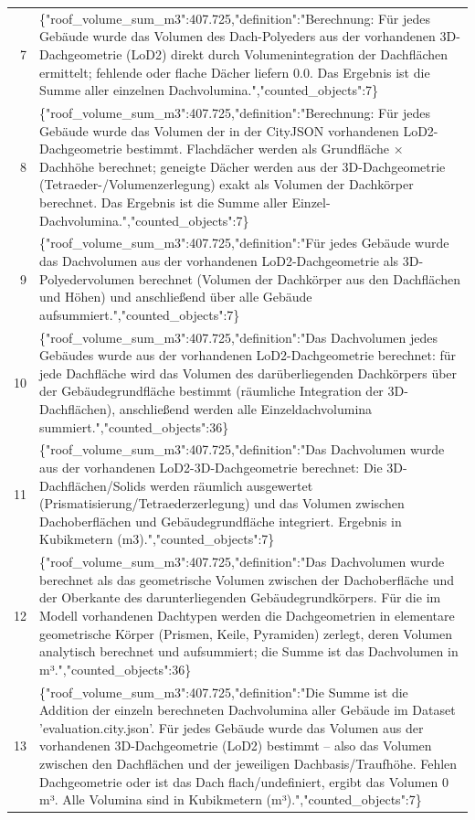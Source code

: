 \documentclass[a4paper,11pt]{article}
\begin{document}
\begin{table}[ht]
\begin{tabular}{r p{12cm}}
7 & \{"roof\_volume\_sum\_m3":407.725,"definition":"Berechnung: Für jedes Gebäude wurde das Volumen des Dach-Polyeders aus der vorhandenen 3D-Dachgeometrie (LoD2) direkt durch Volumenintegration der Dachflächen ermittelt; fehlende oder flache Dächer liefern 0.0. Das Ergebnis ist die Summe aller einzelnen Dachvolumina.","counted\_objects":7\} \\
8 & \{"roof\_volume\_sum\_m3":407.725,"definition":"Berechnung: Für jedes Gebäude wurde das Volumen der in der CityJSON vorhandenen LoD2-Dachgeometrie bestimmt. Flachdächer werden als Grundfläche × Dachhöhe berechnet; geneigte Dächer werden aus der 3D-Dachgeometrie (Tetraeder-/Volumenzerlegung) exakt als Volumen der Dachkörper berechnet. Das Ergebnis ist die Summe aller Einzel-Dachvolumina.","counted\_objects":7\} \\
9 & \{"roof\_volume\_sum\_m3":407.725,"definition":"Für jedes Gebäude wurde das Dachvolumen aus der vorhandenen LoD2-Dachgeometrie als 3D-Polyedervolumen berechnet (Volumen der Dachkörper aus den Dachflächen und Höhen) und anschließend über alle Gebäude aufsummiert.","counted\_objects":7\} \\
10 & \{"roof\_volume\_sum\_m3":407.725,"definition":"Das Dachvolumen jedes Gebäudes wurde aus der vorhandenen LoD2-Dachgeometrie berechnet: für jede Dachfläche wird das Volumen des darüberliegenden Dachkörpers über der Gebäudegrundfläche bestimmt (räumliche Integration der 3D-Dachflächen), anschließend werden alle Einzeldachvolumina summiert.","counted\_objects":36\} \\
11 & \{"roof\_volume\_sum\_m3":407.725,"definition":"Das Dachvolumen wurde aus der vorhandenen LoD2-3D-Dachgeometrie berechnet: Die 3D-Dachflächen/Solids werden räumlich ausgewertet (Prismatisierung/Tetraederzerlegung) und das Volumen zwischen Dachoberflächen und Gebäudegrundfläche integriert. Ergebnis in Kubikmetern (m3).","counted\_objects":7\} \\
12 & \{"roof\_volume\_sum\_m3":407.725,"definition":"Das Dachvolumen wurde berechnet als das geometrische Volumen zwischen der Dachoberfläche und der Oberkante des darunterliegenden Gebäudegrundkörpers. Für die im Modell vorhandenen Dachtypen werden die Dachgeometrien in elementare geometrische Körper (Prismen, Keile, Pyramiden) zerlegt, deren Volumen analytisch berechnet und aufsummiert; die Summe ist das Dachvolumen in m³.","counted\_objects":36\} \\
13 & \{"roof\_volume\_sum\_m3":407.725,"definition":"Die Summe ist die Addition der einzeln berechneten Dachvolumina aller Gebäude im Dataset 'evaluation.city.json'. Für jedes Gebäude wurde das Volumen aus der vorhandenen 3D-Dachgeometrie (LoD2) bestimmt – also das Volumen zwischen den Dachflächen und der jeweiligen Dachbasis/Traufhöhe. Fehlen Dachgeometrie oder ist das Dach flach/undefiniert, ergibt das Volumen 0 m³. Alle Volumina sind in Kubikmetern (m³).","counted\_objects":7\} \\

\end{tabular}
\end{table}
\end{document}
